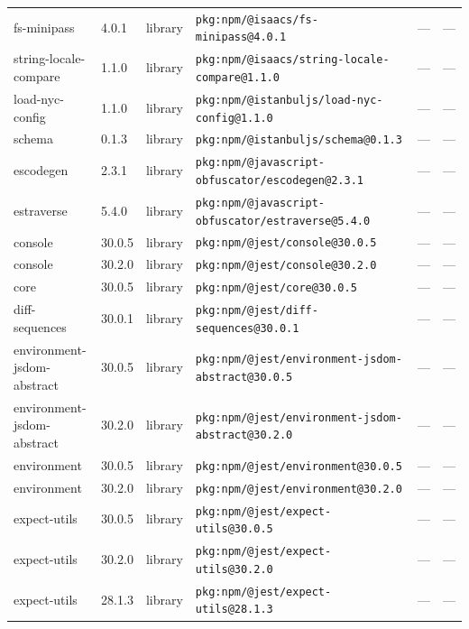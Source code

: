 \documentclass[11pt,a4paper]{article}
\begin{document}
\begin{longtable}{|p{4cm}|p{2cm}|p{1.6cm}|p{5cm}|p{1.5cm}|p{3.5cm}|}
\raggedright fs-minipass & 4.0.1 & library & \small\texttt{pkg:npm/@isaacs/fs-minipass@4.0.1} & — & \small — \\
\raggedright string-locale-compare & 1.1.0 & library & \small\texttt{pkg:npm/@isaacs/string-locale-compare@1.1.0} & — & \small — \\
\raggedright load-nyc-config & 1.1.0 & library & \small\texttt{pkg:npm/@istanbuljs/load-nyc-config@1.1.0} & — & \small — \\
\raggedright schema & 0.1.3 & library & \small\texttt{pkg:npm/@istanbuljs/schema@0.1.3} & — & \small — \\
\raggedright escodegen & 2.3.1 & library & \small\texttt{pkg:npm/@javascript-obfuscator/escodegen@2.3.1} & — & \small — \\
\raggedright estraverse & 5.4.0 & library & \small\texttt{pkg:npm/@javascript-obfuscator/estraverse@5.4.0} & — & \small — \\
\raggedright console & 30.0.5 & library & \small\texttt{pkg:npm/@jest/console@30.0.5} & — & \small — \\
\raggedright console & 30.2.0 & library & \small\texttt{pkg:npm/@jest/console@30.2.0} & — & \small — \\
\raggedright core & 30.0.5 & library & \small\texttt{pkg:npm/@jest/core@30.0.5} & — & \small — \\
\raggedright diff-sequences & 30.0.1 & library & \small\texttt{pkg:npm/@jest/diff-sequences@30.0.1} & — & \small — \\
\raggedright environment-jsdom-abstract & 30.0.5 & library & \small\texttt{pkg:npm/@jest/environment-jsdom-abstract@30.0.5} & — & \small — \\
\raggedright environment-jsdom-abstract & 30.2.0 & library & \small\texttt{pkg:npm/@jest/environment-jsdom-abstract@30.2.0} & — & \small — \\
\raggedright environment & 30.0.5 & library & \small\texttt{pkg:npm/@jest/environment@30.0.5} & — & \small — \\
\raggedright environment & 30.2.0 & library & \small\texttt{pkg:npm/@jest/environment@30.2.0} & — & \small — \\
\raggedright expect-utils & 30.0.5 & library & \small\texttt{pkg:npm/@jest/expect-utils@30.0.5} & — & \small — \\
\raggedright expect-utils & 30.2.0 & library & \small\texttt{pkg:npm/@jest/expect-utils@30.2.0} & — & \small — \\
\raggedright expect-utils & 28.1.3 & library & \small\texttt{pkg:npm/@jest/expect-utils@28.1.3} & — & \small — \\

\end{longtable}
\end{document}
